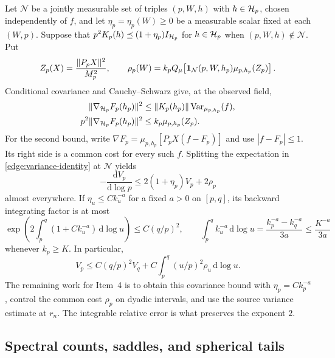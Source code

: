 Let \(\mathcal N\) be a jointly measurable set of triples \((p,W,h)\)
with \(h\in\mathcal H_p\), chosen independently of \(f\), and let
\(\eta_p=\eta_p(W)\ge0\) be a measurable scalar fixed at each
\((W,p)\).  Suppose that
\(p^2K_p(h)\preceq(1+\eta_p)I_{\mathcal H_p}\) for \(h\in\mathcal H_p\) when
\((p,W,h)\notin\mathcal N\).  Put
\begin{equation}\label{edge:common-failure-cost}
 Z_p(X)=\frac{\|P_pX\|^2}{M_p^2},\qquad
 \rho_p(W)=k_pQ_\mu\!\left[
       \mathbf 1_{\mathcal N}(p,W,h_p)\mu_{p,h_p}(Z_p)\right].
\end{equation}
Conditional covariance and Cauchy--Schwarz give, at the observed field,
\begin{equation}\label{edge:gradient-bounds}
 \begin{split}
 \|\nabla_{\mathcal H_p}F_p(h_p)\|^2
       &\le\|K_p(h_p)\|\operatorname{Var}_{\mu_{p,h_p}}(f),\\
 p^2\|\nabla_{\mathcal H_p}F_p(h_p)\|^2
       &\le k_p\mu_{p,h_p}(Z_p).
 \end{split}
\end{equation}
For the second bound, write
\(\nabla F_p=\mu_{p,h_p}[P_pX(f-F_p)]\) and use \(|f-F_p|\le1\).
Its right side is a common cost for every such \(f\).  Splitting the
expectation in \eqref{edge:variance-identity} at \(\mathcal N\) yields
\begin{equation}\label{edge:variance-differential}
 -\frac{\mathrm dV_p}{\mathrm d\log p}
       \le2(1+\eta_p)V_p+2\rho_p
\end{equation}
almost everywhere.  If \(\eta_u\le Ck_u^{-a}\) for a fixed \(a>0\) on
\([p,q]\), its backward integrating factor is at most
\[
 \exp\left(2\int_p^q(1+Ck_u^{-a})\,\mathrm d\log u\right)
       \le C(q/p)^2,\qquad
 \int_p^qk_u^{-a}\,\mathrm d\log u
       =\frac{k_p^{-a}-k_q^{-a}}{3a}\le\frac{K^{-a}}{3a}
\]
whenever \(k_p\ge K\).  In particular,
\begin{equation}\label{edge:variance-amplification}
 V_p\le C(q/p)^2V_q+
       C\int_p^q(u/p)^2\rho_u\,\mathrm d\log u .
\end{equation}
The remaining work for Item~4 is to obtain this covariance bound with
\(\eta_p=Ck_p^{-a}\), control the common cost \(\rho_p\) on dyadic
intervals, and use the source variance estimate at \(r_n\).  The
integrable relative error is what preserves the exponent \(2\).

\subsection{Spectral counts, saddles, and spherical tails}


